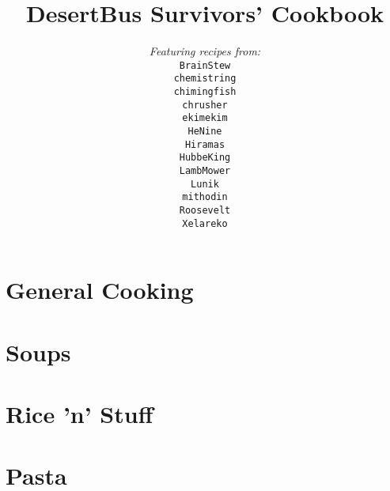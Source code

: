 \documentclass[12pt,a4paper,twoside]{book}
\title{DesertBus Survivors' Cookbook}
\author{\textit{Featuring recipes from:}\\
		\texttt{BrainStew}\\%
		\texttt{chemistring}\\%
		\texttt{chimingfish}\\%
		\texttt{chrusher}\\%
		\texttt{ekimekim}\\%
		\texttt{HeNine}\\%
		\texttt{Hiramas}\\%
		\texttt{HubbeKing}\\%
		\texttt{LambMower}\\%
		\texttt{Lunik}\\%
		\texttt{mithodin}\\%
		\texttt{Roosevelt}\\%
		\texttt{Xelareko}
}
\begin{document}
	\maketitle
	\tableofcontents
	\clearpage

	\chapter{General Cooking}
	\clearpage

	
	\clearpage
	
	\clearpage
	
	\clearpage

	
	\clearpage
	
	\clearpage
	
	\clearpage
	
	\clearpage
	
	\clearpage

	
    \clearpage
    
    \clearpage
    

	\chapter{Soups}
	\clearpage

	
	\clearpage
	
	\clearpage
	
	\clearpage
	
	\clearpage
	
	\clearpage
	

	\chapter{Rice 'n' Stuff}
	\clearpage

	
	\clearpage
	
	\clearpage
	
	\clearpage
	
	\clearpage
	
	\clearpage
	

	\chapter{Pasta}
	\clearpage

	
	\clearpage
	
	\clearpage
	
	\clearpage
	
\end{document}
